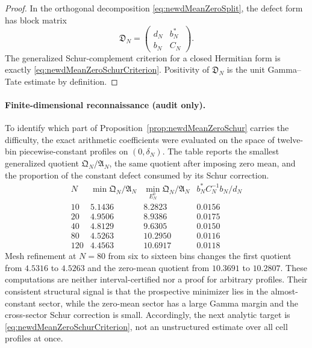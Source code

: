 \begin{proof}
In the orthogonal decomposition \eqref{eq:newdMeanZeroSplit}, the defect
form has block matrix
\[
 \mathfrak D_N=
 \begin{pmatrix}d_N&b_N^*\\ b_N&C_N\end{pmatrix}.
\]
The generalized Schur-complement criterion for a closed Hermitian form is
exactly \eqref{eq:newdMeanZeroSchurCriterion}.  Positivity of
$\mathfrak D_N$ is the unit Gamma--Tate estimate by definition.
\end{proof}

\paragraph{Finite-dimensional reconnaissance (audit only).}
To identify which part of Proposition~\ref{prop:newdMeanZeroSchur} carries
the difficulty, the exact arithmetic coefficients were evaluated on the
space of twelve-bin piecewise-constant profiles on $(0,\delta_N)$.  The
table reports the smallest generalized quotient
$\mathfrak Q_N/\mathfrak A_N$, the same quotient after imposing zero mean,
and the proportion of the constant defect consumed by its Schur correction.
\[
\begin{array}{c|c|c|c}
N&\min \mathfrak Q_N/\mathfrak A_N&
\min_{E_N^0}\mathfrak Q_N/\mathfrak A_N&
b_N^*C_N^{-1}b_N/d_N\\ \hline
10 &5.1436&8.2823&0.0156\\
20 &4.9506&8.9386&0.0175\\
40 &4.8129&9.6305&0.0150\\
80 &4.5263&10.2950&0.0116\\
120&4.4563&10.6917&0.0118
\end{array}
\]
Mesh refinement at $N=80$ from six to sixteen bins changes the first
quotient from $4.5316$ to $4.5263$ and the zero-mean quotient from
$10.3691$ to $10.2807$.  These computations are neither interval-certified
nor a proof for arbitrary profiles.  Their consistent structural signal is
that the prospective minimizer lies in the almost-constant sector, while
the zero-mean sector has a large Gamma margin and the cross-sector Schur
correction is small.  Accordingly, the next analytic target is
\eqref{eq:newdMeanZeroSchurCriterion}, not an unstructured estimate over
all cell profiles at once.

